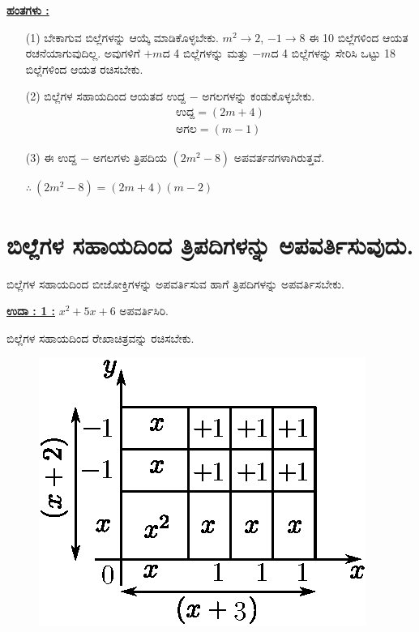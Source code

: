 \eject

\noindent
{\textbf{\underline{ಹಂತಗಳು :}}}
\begin{itemize}
\item [(1)] ಬೇಕಾಗುವ ಬಿಲ್ಲೆಗಳನ್ನು ಆಯ್ಕೆ ಮಾಡಿಕೊಳ್ಳಬೇಕು. $m^2 \rightarrow 2$, $-1 \rightarrow 8$  ಈ 10 ಬಿಲ್ಲೆಗಳಿಂದ ಆಯತ ರಚನೆಯಾಗುವುದಿಲ್ಲ. ಅವುಗಳಿಗೆ $+m$ದ 4 ಬಿಲ್ಲೆಗಳನ್ನು ಮತ್ತು $-m$ದ 4 ಬಿಲ್ಲೆಗಳನ್ನು ಸೇರಿಸಿ ಒಟ್ಟು 18 ಬಿಲ್ಲೆಗಳಿಂದ ಆಯತ ರಚಿಸಬೇಕು. 
\item [(2)] ಬಿಲ್ಲೆಗಳ ಸಹಾಯದಿಂದ ಆಯತದ ಉದ್ದ $-$ ಅಗಲಗಳನ್ನು ಕಂಡುಕೊಳ್ಳಬೇಕು.
\begin{gather*}
\text{ಉದ್ದ} = (2m+4)\\
\text{ಅಗಲ} = (m-1)
\end{gather*}

\item [(3)] ಈ ಉದ್ದ $-$ ಅಗಲಗಳು ತ್ರಿಪದಿಯ $(2m^{2}-8)$ ಅಪವರ್ತನಗಳಾಗಿರುತ್ತವೆ. 

$\therefore~ (2m^2 - 8) = (2m + 4)(m-2)$
\end{itemize}

\section{ಬಿಲ್ಲೆಗಳ ಸಹಾಯದಿಂದ ತ್ರಿಪದಿಗಳನ್ನು ಅಪವರ್ತಿಸುವುದು.}\label{sec3.9}%

ಬಿಲ್ಲೆಗಳ ಸಹಾಯದಿಂದ ಬೀಜೋಕ್ತಿಗಳನ್ನು ಅಪವರ್ತಿಸುವ ಹಾಗೆ ತ್ರಿಪದಿಗಳನ್ನು ಅಪವರ್ತಿಸಬೇಕು. 

\noindent
{\textbf{\underline{ಉದಾ : 1 :}}} $x^2 + 5x + 6				$ ಅಪವರ್ತಿಸಿರಿ. 

ಬಿಲ್ಲೆಗಳ ಸಹಾಯದಿಂದ ರೇಖಾಚಿತ್ರವನ್ನು ರಚಿಸಬೇಕು.
\begin{figure}[H]
\centering
\includegraphics[scale=0.8]{src/figure/chap3/fig3-39b.eps}
\end{figure}

